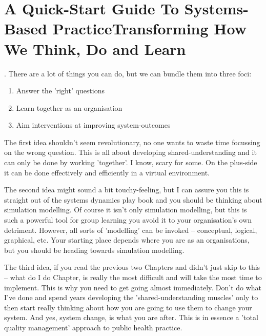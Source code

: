 \chapter[A Quick-Start Guide To Systems-Based Practice]{A Quick-Start Guide To Systems-Based Practice\linebreak Transforming How We Think, Do and Learn}



. There are a lot of things you can do, but we can bundle them into three foci:
\begin{enumerate}
	\item Answer the 'right' questions
	\item Learn together as an organisation
	\item Aim interventions at improving system-outcomes
\end{enumerate}
The first idea shouldn't seem revolutionary, no one wants to waste time focussing on the wrong question. This is all about developing shared-understanding and it can only be done by working 'together'. I know, scary for some. On the plus-side it can be done effectively and efficiently in a virtual environment.
 
The second idea might sound a bit touchy-feeling, but I can assure you this is straight out of the systems dynamics play book and you should be thinking about simulation modelling. Of course it isn't only simulation modelling, but this is such a powerful tool for group learning you avoid it to your organisation's own detriment. However, all sorts of 'modelling' can be invoked -- conceptual, logical, graphical, etc. Your starting place depends where you are as an organisations, but you should be heading towards simulation modelling.

The third idea, if you read the previous two Chapters and didn't just skip to this -- what do I do Chapter, is really the most difficult and will take the most time to implement. This is why you need to get going almost immediately. Don't do what I've done and spend years developing the 'shared-understanding muscles' only to then start really thinking about how you are going to use them to change your system. And yes, system change, is what you are after. This is in essence a 'total quality management' approach to public health practice.

